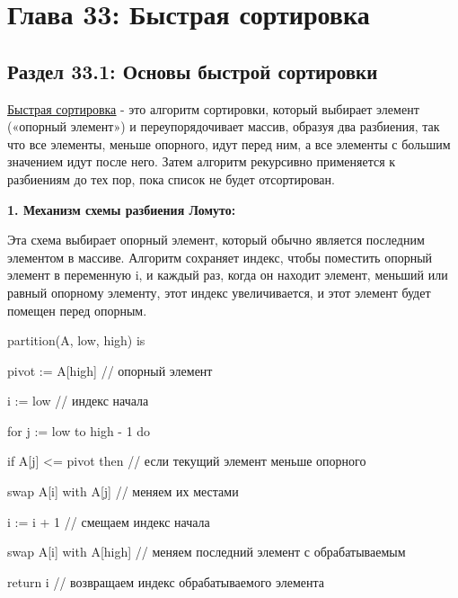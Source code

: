 \newpage
\chapter*{Глава 33: Быстрая сортировка}

\section*{Раздел 33.1: Основы быстрой сортировки}
\href{https://en.wikipedia.org/wiki/Quicksort}{\underline{{Быстрая сортировка}}} - это алгоритм сортировки, который выбирает элемент («опорный элемент») и переупорядочивает массив, образуя два разбиения, так что все элементы, меньше опорного, идут перед ним, а все элементы с большим значением идут после него. Затем алгоритм рекурсивно применяется к разбиениям до тех пор, пока список не будет отсортирован.

\vspace{\baselineskip}

\textbf{1. Механизм схемы разбиения Ломуто:}

\vspace{\baselineskip}

Эта схема выбирает опорный элемент, который обычно является последним элементом в массиве. Алгоритм сохраняет индекс, чтобы поместить опорный элемент в переменную i, и каждый раз, когда он находит элемент, меньший или равный опорному элементу, этот индекс увеличивается, и этот элемент будет помещен перед опорным.
\begin{tcolorbox}[breakable,enhanced,before upper={\parindent10pt}]
\noindent partition(A, low, high) is

pivot := A[high] // опорный элемент

i := low // индекс начала

for j := low to high - 1 do

\indent if A[j] <= pivot then // если текущий элемент меньше опорного

\indent\indent swap A[i] with A[j] // меняем их местами

\indent\indent i := i + 1 // смещаем индекс начала

swap A[i] with A[high]	// меняем последний элемент с обрабатываемым

return i // возвращаем индекс обрабатываемого элемента

\end{tcolorbox}

\vspace{\baselineskip}

